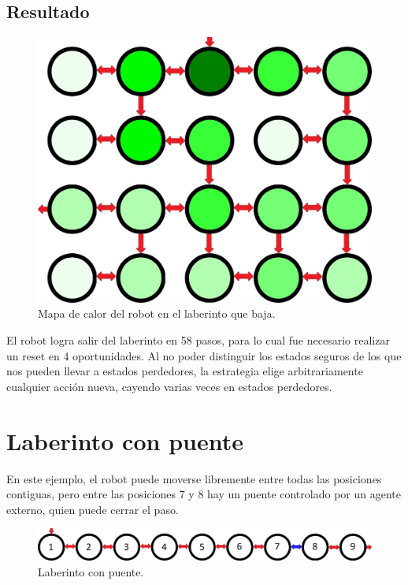 \clearpage

\subsection{Resultado}

\begin{figure}[H]
	\centering
		\includegraphics[width=1.0\textwidth]{Imagenes/Laberintos/down_calor.png}
	\caption{Mapa de calor del robot en el laberinto que baja.}
	\label{fig:down_calor}
\end{figure}

El robot logra salir del laberinto en 58 pasos, para lo cual fue necesario realizar un reset en 4 oportunidades. 
Al no poder distinguir los estados seguros de los que nos pueden llevar a estados perdedores, la estrategia elige arbitrariamente 
cualquier acción nueva, cayendo varias veces en estados perdedores.

\clearpage

\section{Laberinto con puente}

En este ejemplo, el robot puede moverse libremente entre todas las posiciones contiguas, pero entre las posiciones 7 y 8 hay un puente 
controlado por un agente externo, quien puede cerrar el paso.

\begin{figure}[H]
	\centering
		\includegraphics[width=1.0\textwidth]{Imagenes/Laberintos/puente.jpg}
	\caption{Laberinto con puente.}
	\label{fig:puente}
\end{figure}

